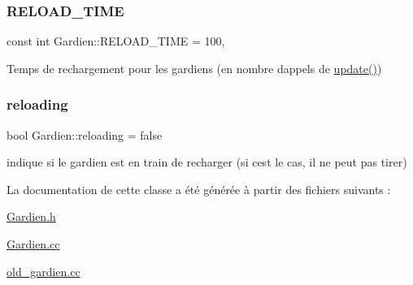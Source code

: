 \subsubsection{\texorpdfstring{R\+E\+L\+O\+A\+D\+\_\+\+T\+I\+ME}{RELOAD\_TIME}}
{\footnotesize\ttfamily const int Gardien\+::\+R\+E\+L\+O\+A\+D\+\_\+\+T\+I\+ME = 100\hspace{0.3cm}{\ttfamily [static]}, {\ttfamily [private]}}



Temps de rechargement pour les gardiens (en nombre d\textquotesingle{}appels de \hyperlink{classGardien_aed498f0d6bbb526e0373a914ba6bf9aa}{update()}) 

\mbox{\label{classGardien_aabac0fd95b26fdafba349c911542311a}} 
\subsubsection{\texorpdfstring{reloading}{reloading}}
{\footnotesize\ttfamily bool Gardien\+::reloading = false\hspace{0.3cm}{\ttfamily [private]}}



indique si le gardien est en train de recharger (si c\textquotesingle{}est le cas, il ne peut pas tirer) 



La documentation de cette classe a été générée à partir des fichiers suivants \+:\begin{DoxyCompactItemize}
\item 
\hyperlink{Gardien_8h}{Gardien.\+h}\item 
\hyperlink{Gardien_8cc}{Gardien.\+cc}\item 
\hyperlink{old__gardien_8cc}{old\+\_\+gardien.\+cc}\end{DoxyCompactItemize}
